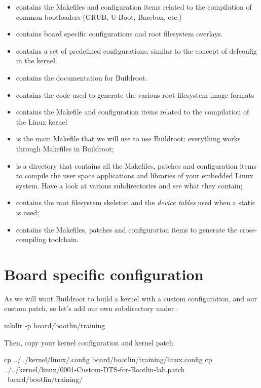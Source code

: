 \begin{itemize}
\item {} contains the Makefiles and configuration items
  related to the compilation of common bootloaders (GRUB, U-Boot,
  Barebox, etc.)
\item {} contains board specific configurations and
  root filesystem overlays.
\item {} contains a set of predefined configurations,
  similar to the concept of defconfig in the kernel.
\item {} contains the documentation for Buildroot.
\item {} contains the code used to generate the various root
  filesystem image formats
\item {} contains the Makefile and configuration items
  related to the compilation of the Linux kernel
\item {} is the main Makefile that we will use to use
  Buildroot: everything works through Makefiles in Buildroot;
\item {} is a directory that contains all the Makefiles,
  patches and configuration items to compile the user space
  applications and libraries of your embedded Linux system. Have a
  look at various subdirectories and see what they contain;
\item {} contains the root filesystem skeleton and the {\em
    device tables} used when a static  is used;
\item {} contains the Makefiles, patches and
  configuration items to generate the cross-compiling toolchain.
\end{itemize}

\section{Board specific configuration}

As we will want Buildroot to build a kernel with a custom configuration,
and our custom patch, so let's add our own subdirectory under
:

\begin{bashinput}
mkdir -p board/bootlin/training
\end{bashinput}

Then, copy your kernel configuration and kernel patch:

\begin{bashinput}
cp ../../kernel/linux/.config board/bootlin/training/linux.config
cp ../../kernel/linux/0001-Custom-DTS-for-Bootlin-lab.patch \
   board/bootlin/training/
\end{bashinput}

